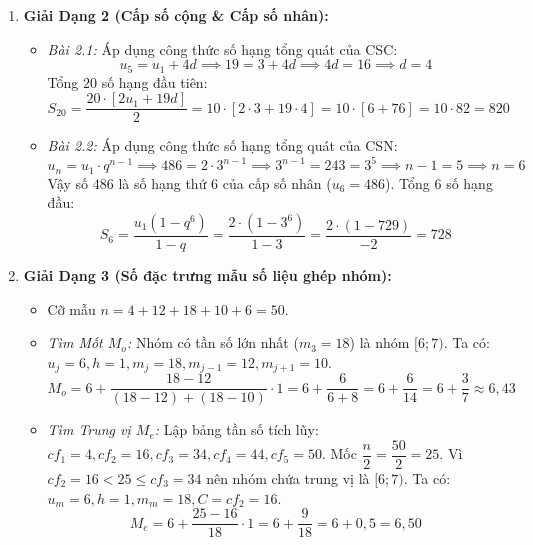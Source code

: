 \documentclass[12pt, a4paper]{article}
\begin{document}
\begin{enumerate}[leftmargin=0.6cm]
    \item \textbf{Giải Dạng 2 (Cấp số cộng \& Cấp số nhân):}
    \begin{itemize}
        \item \textit{Bài 2.1:} 
        Áp dụng công thức số hạng tổng quát của CSC:
        $$u_5 = u_1 + 4d \implies 19 = 3 + 4d \implies 4d = 16 \implies d = 4$$
        Tổng $20$ số hạng đầu tiên:
        $$S_{20} = \dfrac{20 \cdot [2u_1 + 19d]}{2} = 10 \cdot [2 \cdot 3 + 19 \cdot 4] = 10 \cdot [6 + 76] = 10 \cdot 82 = 820$$

        \item \textit{Bài 2.2:}
        Áp dụng công thức số hạng tổng quát của CSN:
        $$u_n = u_1 \cdot q^{n-1} \implies 486 = 2 \cdot 3^{n-1} \implies 3^{n-1} = 243 = 3^5 \implies n - 1 = 5 \implies n = 6$$
        Vậy số $486$ là số hạng thứ $6$ của cấp số nhân ($u_6 = 486$).
        Tổng $6$ số hạng đầu:
        $$S_6 = \dfrac{u_1(1 - q^6)}{1 - q} = \dfrac{2 \cdot (1 - 3^6)}{1 - 3} = \dfrac{2 \cdot (1 - 729)}{-2} = 728$$
    \end{itemize}

    \item \textbf{Giải Dạng 3 (Số đặc trưng mẫu số liệu ghép nhóm):}
    \begin{itemize}
        \item Cỡ mẫu $n = 4 + 12 + 18 + 10 + 6 = 50$.
        \item \textit{Tìm Mốt $M_o$:} Nhóm có tần số lớn nhất ($m_3 = 18$) là nhóm $[6; 7)$.
        Ta có: $u_j = 6, h = 1, m_j = 18, m_{j-1} = 12, m_{j+1} = 10$.
        $$M_o = 6 + \dfrac{18 - 12}{(18 - 12) + (18 - 10)} \cdot 1 = 6 + \dfrac{6}{6 + 8} = 6 + \dfrac{6}{14} = 6 + \dfrac{3}{7} \approx 6{,}43$$

        \item \textit{Tìm Trung vị $M_e$:}
        Lập bảng tần số tích lũy: $cf_1 = 4, cf_2 = 16, cf_3 = 34, cf_4 = 44, cf_5 = 50$.
        Mốc $\dfrac{n}{2} = \dfrac{50}{2} = 25$.
        Vì $cf_2 = 16 < 25 \le cf_3 = 34$ nên nhóm chứa trung vị là $[6; 7)$.
        Ta có: $u_m = 6, h = 1, m_m = 18, C = cf_2 = 16$.
        $$M_e = 6 + \dfrac{25 - 16}{18} \cdot 1 = 6 + \dfrac{9}{18} = 6 + 0{,}5 = 6{,}50$$
    \end{itemize}
\end{enumerate}
\end{document}
